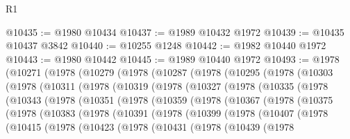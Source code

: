 \begin{lexlean}{R1}
\begin{coremodule}
@10435 := @1980 @10434
@10437 := @1989 @10432 @1972
@10439 := @10435 @10437 @3842
@10440 := @10255 @1248
@10442 := @1982 @10440 @1972
@10443 := @1980 @10442
@10445 := @1989 @10440 @1972
@10493 := @1978
    (@10271
      (@1978
        (@10279
          (@1978
            (@10287
              (@1978
                (@10295
                  (@1978
                    (@10303
                      (@1978
                        (@10311
                          (@1978
                            (@10319
                              (@1978
                                (@10327
                                  (@1978
                                    (@10335
                                      (@1978
                                        (@10343
                                          (@1978
                                            (@10351
                                              (@1978
                                                (@10359
                                                  (@1978
                                                    (@10367
                                                      (@1978
                                                        (@10375
                                                          (@1978
                                                            (@10383
                                                              (@1978
                                                                (@10391
                                                                  (@1978
                                                                    (@10399
                                                                      (@1978
                                                                        (@10407
                                                                          (@1978
                                                                            (@10415
                                                                              (@1978
                                                                                (@10423
                                                                                  (@1978
                                                                                    (@10431
                                                                                      (@1978
                                                                                        (@10439
                                                                                          (@1978

\end{coremodule}
\end{lexlean}
